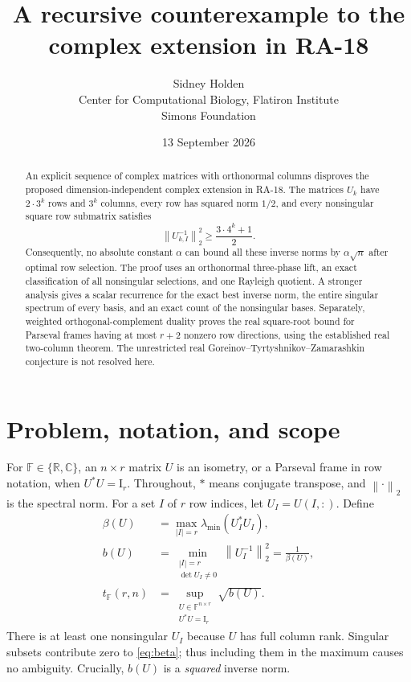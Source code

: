 \documentclass[11pt,letterpaper]{article}
\title{A recursive counterexample to the complex extension in RA-18}
\author{Sidney Holden\\{\small Center for Computational Biology, Flatiron Institute}\\{\small Simons Foundation}}
\date{13 September 2026}
\theoremstyle{definition}
\theoremstyle{remark}
\newcommand{\R}{\mathbb R}
\newcommand{\C}{\mathbb C}
\newcommand{\F}{\mathbb F}
\newcommand{\Id}{\mathrm I}
\newcommand{\norm}[1]{\left\lVert#1\right\rVert}
\begin{document}
\maketitle

\begin{abstract}
An explicit sequence of complex matrices with orthonormal columns disproves the proposed dimension-independent complex extension in RA-18. The matrices $U_k$ have $2\cdot3^k$ rows and $3^k$ columns, every row has squared norm $1/2$, and every nonsingular square row submatrix satisfies
\[
 \norm{U_{k,I}^{-1}}_2^2\ge \frac{3\cdot4^k+1}{2}.
\]
Consequently, no absolute constant $\alpha$ can bound all these inverse norms by $\alpha\sqrt n$ after optimal row selection. The proof uses an orthonormal three-phase lift, an exact classification of all nonsingular selections, and one Rayleigh quotient. A stronger analysis gives a scalar recurrence for the exact best inverse norm, the entire singular spectrum of every basis, and an exact count of the nonsingular bases. Separately, weighted orthogonal-complement duality proves the real square-root bound for Parseval frames having at most $r+2$ nonzero row directions, using the established real two-column theorem. The unrestricted real Goreinov--Tyrtyshnikov--Zamarashkin conjecture is not resolved here.
\end{abstract}

\section{Problem, notation, and scope}

For $\F\in\{\R,\C\}$, an $n\times r$ matrix $U$ is an isometry, or a Parseval frame in row notation, when $U^*U=\Id_r$. Throughout, $*$ means conjugate transpose, and $\norm{\cdot}_2$ is the spectral norm. For a set $I$ of $r$ row indices, let $U_I=U(I,:)$. Define
\begin{align}
 \beta(U)&=\max_{|I|=r}\lambda_{\min}(U_I^*U_I), \label{eq:beta}\\
 b(U)&=\min_{\substack{|I|=r\\\det U_I\ne0}}\norm{U_I^{-1}}_2^2
       =\frac1{\beta(U)}, \label{eq:b}\\
 t_\F(r,n)&=\sup_{\substack{U\in\F^{n\times r}\\U^*U=\Id_r}}\sqrt{b(U)}.\label{eq:t}
\end{align}
There is at least one nonsingular $U_I$ because $U$ has full column rank. Singular subsets contribute zero to \eqref{eq:beta}; thus including them in the maximum causes no ambiguity. Crucially, $b(U)$ is a \emph{squared} inverse norm.
\end{document}
